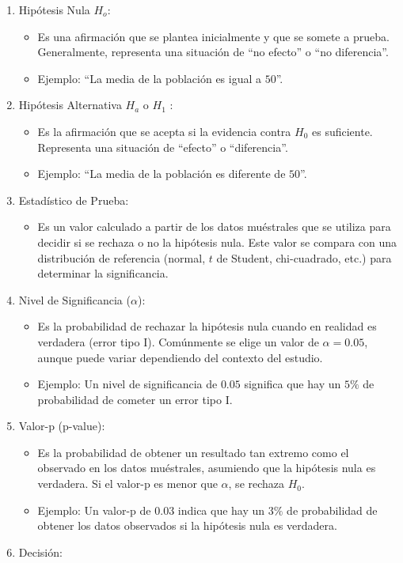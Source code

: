 \documentclass[
  us-letterpaper,
]{scrreprt}
\providecommand{\tightlist}{%
  \setlength{\itemsep}{0pt}\setlength{\parskip}{0pt}}\usepackage{longtable,booktabs,array}
\theoremstyle{plain}
\theoremstyle{plain}
\theoremstyle{definition}
\theoremstyle{remark}
\begin{document}
\begin{enumerate}
\def\labelenumi{\arabic{enumi}.}
\item
  Hipótesis Nula \(H_o\):

  \begin{itemize}
  \item
    Es una afirmación que se plantea inicialmente y que se somete a
    prueba. Generalmente, representa una situación de ``no efecto'' o
    ``no diferencia''.
  \item
    Ejemplo: ``La media de la población es igual a \(50\)''.
  \end{itemize}
\item
  Hipótesis Alternativa \(H_a\) o \(H_1\) :

  \begin{itemize}
  \item
    Es la afirmación que se acepta si la evidencia contra \(H_0\) es
    suficiente. Representa una situación de ``efecto'' o ``diferencia''.
  \item
    Ejemplo: ``La media de la población es diferente de \(50\)''.
  \end{itemize}
\item
  Estadístico de Prueba:

  \begin{itemize}
  \tightlist
  \item
    Es un valor calculado a partir de los datos muéstrales que se
    utiliza para decidir si se rechaza o no la hipótesis nula. Este
    valor se compara con una distribución de referencia (normal, \(t\)
    de Student, chi-cuadrado, etc.) para determinar la significancia.
  \end{itemize}
\item
  Nivel de Significancia (\(\alpha\)):

  \begin{itemize}
  \item
    Es la probabilidad de rechazar la hipótesis nula cuando en realidad
    es verdadera (error tipo I). Comúnmente se elige un valor de
    \(\alpha= 0.05\), aunque puede variar dependiendo del contexto del
    estudio.
  \item
    Ejemplo: Un nivel de significancia de \(0.05\) significa que hay un
    \(5\%\) de probabilidad de cometer un error tipo I.
  \end{itemize}
\item
  Valor-p (p-value):

  \begin{itemize}
  \item
    Es la probabilidad de obtener un resultado tan extremo como el
    observado en los datos muéstrales, asumiendo que la hipótesis nula
    es verdadera. Si el valor-p es menor que \(\alpha\), se rechaza
    \(H_0\).
  \item
    Ejemplo: Un valor-p de \(0.03\) indica que hay un \(3 \%\) de
    probabilidad de obtener los datos observados si la hipótesis nula es
    verdadera.
  \end{itemize}
\item
  Decisión:


\end{enumerate}
\end{document}
